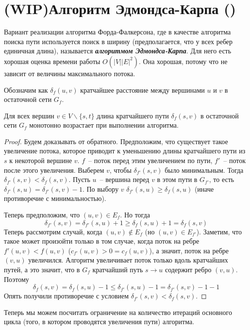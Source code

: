 \let\bf\bfseries
\let\it\itshape
\section{(WIP)Алгоритм Эдмондса-Карпа (\groth)}\label{edmonds_karp}
Вариант реализации алгоритма Форда-Фалкерсона, где в качестве алгоритма поиска пути используется поиск в ширину (предполагается, что у всех ребер единичная длина), называется {\bf\it алгоритмом Эдмондса-Карпа}. Для него есть хорошая оценка времени работы $O(|V||E|^2)$. Она хорошая, потому что не зависит от величины максимального потока.

Обозначим как $\delta_f(u,v)$ кратчайшее расстояние между вершинами $u$ и $v$ в остаточной сети $G_f$.
\begin{lemma}\label{someshit5}
	Для всех вершин $v\in V\smallsetminus\{s,t\}$ длина кратчайшего пути $\delta_f(s,v)$ в остаточной сети $G_f$ монотонно возрастает при выполнении алгоритма.
\end{lemma}
\begin{proof}
	Будем доказывать от обратного. Предположим, что существует такое увеличение потока, которое приводит к уменьшению длины кратчайшего пути из $s$ к некоторой вершине $v$. $f$~-- поток перед этим увеличением по пути, $f'$~-- поток после этого увеличения. Выберем $v$, чтобы $\delta_{f'}(s,v)$ было минимальным. Тогда $\delta_{f'}(s,v)<\delta_f(s,v)$. Пусть $u$~-- вершина перед $v$ в этом пути в $G_{f'}$, то есть $\delta_{f'}(s,u)=\delta_{f'}(s,v)-1$. По выбору $v$ $\delta_{f'}(s,u)\ge\delta_f(s,u)$ (иначе противоречие с минимальностью). 
	
	Теперь предположим, что $(u,v)\in E_f$. Но тогда $$\delta_{f'}(s,v)=\delta_{f'}(s,u)+1\ge\delta_f(s,u)+1=\delta_f(s,v)$$
	Теперь рассмотрим случай, когда $(u,v)\not\in E_f$ (но $(u,v)\in E_{f'}$). Заметим, что такое может произойти только в том случае, когда поток на ребре $f'(u,v)<f(u,v)$ ($c_{f'}(u,v)>0=c_f(u,v)$), а значит, поток на ребре $(v,u)$ увеличился. Алгоритм увеличивает поток только вдоль кратчайших путей, а это значит, что в $G_f$ кратчайший путь $s\to u$ содержит ребро $(v,u)$. Поэтому $$\delta_f(s,v)=\delta_f(s,u)-1\le\delta_{f'}(s,u)-1=\delta_{f'}(s,v)-1-1$$
	Опять получили противоречие с условием $\delta_{f'}(s,v)<\delta_f(s,v)$.
\end{proof}

Теперь мы можем посчитать ограничение на количество итераций основного цикла (того, в котором проводятся увеличения пути) алгоритма.

